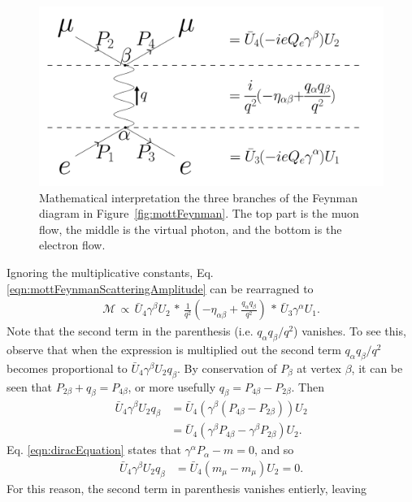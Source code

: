 \begin{figure}
  \centering
    \includegraphics[width=\textwidth]{Figures/MottFeynmanMath} 
  \caption[Mathematical interpretation the three branches of the Feynman diagram in Figure~\ref{fig:mottFeynman}.]{Mathematical interpretation the three branches of the Feynman diagram in Figure~\ref{fig:mottFeynman}. The top part is the muon flow, the middle is the virtual photon, and the bottom is the electron flow.}
  \label{fig:mottFeynmanMath}
\end{figure}
Ignoring the multiplicative constants, Eq. \eqref{eqn:mottFeynmanScatteringAmplitude} can be rearragned to
\begin{align*}
\mathcal{M} \, \propto \, \bar{U}_4\gamma^\beta U_2 \, * \, \frac{1}{q^2}(-\eta_{\alpha\beta}+\frac{q_\alpha q_\beta}{q^2}) \, *\, \bar{U}_3\gamma^\alpha U_1.
\end{align*}
Note that the second term in the parenthesis (i.e. $q_\alpha q_\beta / q^2$) vanishes. To see this, observe that when the expression is multiplied out the second term $q_\alpha q_\beta / q^2$ becomes proportional to $\bar{U}_4\gamma^\beta U_2 q_\beta$. By conservation of $P_\beta$ at vertex $\beta$, it can be seen that $P_{2\beta}+q_\beta=P_{4\beta}$, or more usefully $q_\beta=P_{4\beta}-P_{2\beta}$. Then
\begin{align*}
\bar{U}_4\gamma^\beta U_2 q_\beta&= \bar{U}_4(\gamma^\beta(P_{4\beta}-P_{2\beta})) U_2\\
&= \bar{U}_4(\gamma^\beta P_{4\beta}-\gamma^\beta P_{2\beta}) U_2 .
\end{align*}
Eq. \eqref{eqn:diracEquation} states that $\gamma^\alpha P_\alpha-m=0$, and so
\begin{align*}
\bar{U}_4\gamma^\beta U_2 q_\beta &= \bar{U}_4 (m_\mu-m_\mu) U_2=0.
\end{align*}
For this reason, the second term in parenthesis vanishes entierly, leaving
